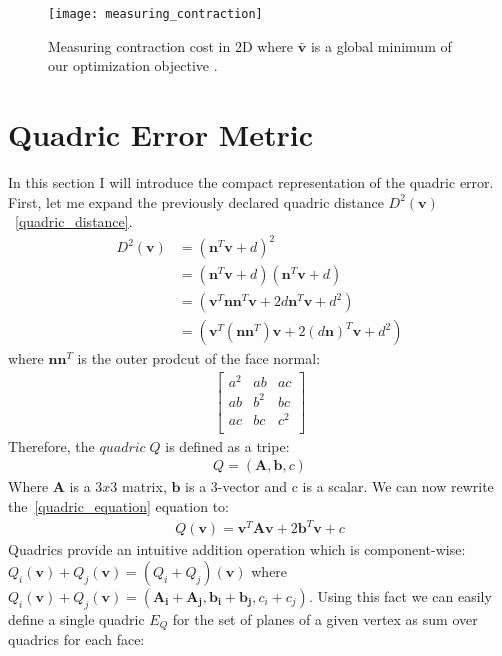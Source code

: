 \begin{figure}[H]
  \begin{center}
    \texttt{[image: measuring\_contraction]}
    \caption{Measuring contraction cost in 2D where $\bar{\mathbf{v}}$ is a global minimum of our optimization objective \cite{garland99}.}
    \label{fig:measuring_contraction_ref}
  \end{center}
\end{figure}

\section{Quadric Error Metric}

In this section I will introduce the compact representation of the quadric error. First, let me expand the previously declared quadric distance $D^2(\mathbf{v})$~\ref{quadric_distance}.
\begin{align}
D^2(\mathbf{v})&=(\mathbf{n}^T\mathbf{v}+d)^2\\
	  &=(\mathbf{n}^T\mathbf{v}+d)(\mathbf{n}^T\mathbf{v}+d)\\
	  &=(\mathbf{v}^T\mathbf{n}\mathbf{n}^T\mathbf{v}+2d\mathbf{n}^T\mathbf{v}+d^2)\\
	  &=(\mathbf{v}^T(\mathbf{n}\mathbf{n}^T)\mathbf{v}+2(d\mathbf{n})^T\mathbf{v}+d^2)
	  \label{quadric_equation}
\end{align}
where $\mathbf{n}\mathbf{n}^T$ is the outer prodcut of the face normal:
\begin{align}
\left[
\begin{array}{rrrr}
a^2 & ab & ac   \\
ab  & b^2 & bc  \\
ac  & bc  & c^2 \\
\end{array}\right]
\end{align}
Therefore, the $quadric\;Q$ is defined as a tripe:
\begin{align}
Q = (\mathbf{A},\mathbf{b},c)
\end{align}
Where $\mathbf{A}$ is a $3x3$ matrix, $\mathbf{b}$ is a 3-vector and c is a scalar. We can now rewrite the~\ref{quadric_equation} equation to:
\begin{align}
Q(\mathbf{v}) = \mathbf{v}^T\mathbf{A}\mathbf{v} + 2\mathbf{b}^T\mathbf{v} + c
\end{align}
Quadrics provide an intuitive addition operation which is component-wise: $Q_i(\mathbf{v}) + Q_j(\mathbf{v}) = (Q_i + Q_j)(\mathbf{v})$ where $Q_i(\mathbf{v}) + Q_j(\mathbf{v}) = (\mathbf{A_i} + \mathbf{A_j}, \mathbf{b_i} + \mathbf{b_j}, c_i + c_j)$. Using this fact we can easily define a single quadric $E_Q$ for the set of planes of a given vertex \cite{garland99} as sum over quadrics for each face:
